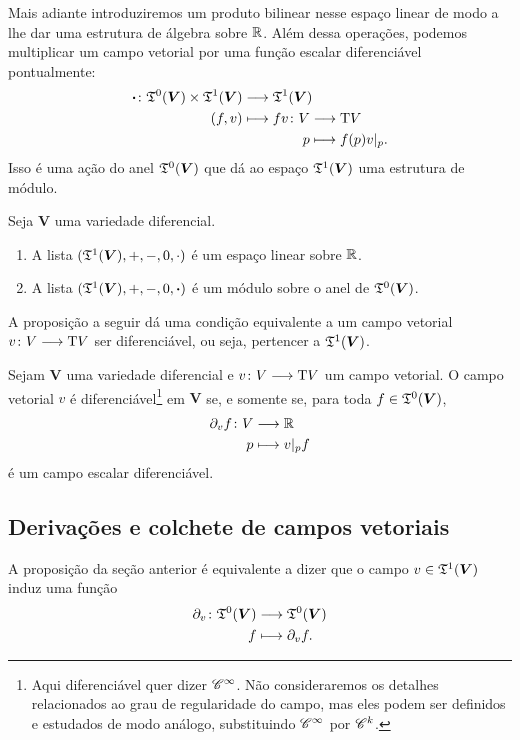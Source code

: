 Mais adiante introduziremos um produto bilinear nesse espaço linear de modo a lhe dar uma estrutura de álgebra sobre $\mathbb{R}$. Além dessa operações, podemos multiplicar um campo vetorial por uma função escalar diferenciável pontualmente:
	\begin{align*}
	\func{\bm\cdot}{\tens^0(\bm V) \times \tens^1(\bm V)}{\tens^1(\bm V)}{(f,v)}{
		\begin{aligned}[t]
		\func{fv}{V}{\Tg V}{p}{f(p)v|_p.}
		\end{aligned}
	}
	\end{align*}
Isso é uma ação do anel $\mathfrak{T}^0(\bm V)$ que dá ao espaço $\mathfrak{T}^1(\bm V)$ uma estrutura de módulo.

\begin{proposition}
Seja $\bm V$ uma variedade diferencial.
	\begin{enumerate}
	\item A lista $(\mathfrak{T}^1(\bm V),+,-,0,\cdot)$ é um espaço linear sobre $\mathbb{R}$.
	\item A lista $(\mathfrak{T}^1(\bm V),+,-,0,\bm\cdot)$ é um módulo sobre o anel de $\mathfrak{T}^0(\bm V)$.
	\end{enumerate}
\end{proposition}

A proposição a seguir dá uma condição equivalente a um campo vetorial ${v}\colon {V} \longrightarrow {\mathrm{T}V}$ ser diferenciável, ou seja, pertencer a $\mathfrak{T}^1(\bm V)$.

\begin{proposition}
Sejam $\bm V$ uma variedade diferencial e ${v}\colon {V} \longrightarrow {\mathrm{T}V}$ um campo vetorial. O campo vetorial $v$ é diferenciável\footnote{Aqui diferenciável quer dizer $\mathscr{C}^\infty$. Não consideraremos os detalhes relacionados ao grau de regularidade do campo, mas eles podem ser definidos e estudados de modo análogo, substituindo $\mathscr{C}^\infty$ por $\mathscr{C}^k$.} em $\bm V$ se, e somente se, para toda $f \in \mathfrak{T}^0(\bm V)$,
	\begin{align*}
	{\partial_v f}\colon {V} &\longrightarrow {\mathbb{R}} \\{p} &\longmapsto v|_p f
	\end{align*}
é um campo escalar diferenciável.
\end{proposition}

\subsection{Derivações e colchete de campos vetoriais}

A proposição da seção anterior é equivalente a dizer que o campo $v \in \mathfrak{T}^1(\bm V)$ induz uma função
	\begin{align*}
	{\partial_v}\colon {\mathfrak{T}^0(\bm V)} &\longrightarrow {\mathfrak{T}^0(\bm V)} \\{f} &\longmapsto \partial_v f.
	\end{align*}

